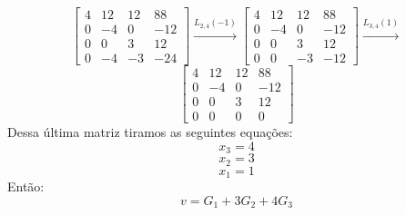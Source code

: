 \documentclass{homework}
\begin{document}
\[
\left[ \begin{array}{ccc|c}
    4 & 12 & 12 & 88\\
    0 & -4 & 0 & -12\\
    0 & 0 & 3 & 12\\
    0 & -4 & -3 & -24
\end{array} \right] \xrightarrow{L_{2,4}(-1)}
\left[ \begin{array}{ccc|c}
    4 & 12 & 12 & 88\\
    0 & -4 & 0 & -12\\
    0 & 0 & 3 & 12\\
    0 & 0 & -3 & -12
\end{array} \right] \xrightarrow{L_{3,4}(1)}
\]
\[
\left[ \begin{array}{ccc|c}
    4 & 12 & 12 & 88\\
    0 & -4 & 0 & -12\\
    0 & 0 & 3 & 12\\
    0 & 0 & 0 & 0
\end{array} \right]
\]
Dessa última matriz tiramos as seguintes equações:
\[x_3 = 4\]
\[x_2 = 3\]
\[x_1 = 1\]
Então:
\[v = G_1 + 3G_2 + 4G_3\]
\end{document}
